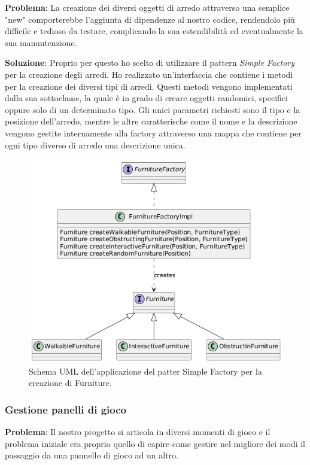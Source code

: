 \documentclass[a4paper,12pt]{report}
\begin{document}
\textbf{Problema}: La creazione dei diversi oggetti di arredo attraverso una semplice "new" comporterebbe
l'aggiunta di dipendenze al nostro codice, rendendolo più difficile e tedioso da testare, 
complicando la sua estendibilità ed eventualmente la sua manuntenzione. 

\textbf{Soluzione}: Proprio per questo ho scelto di utilizzare il pattern \textit{Simple Factory} per la 
creazione degli arredi. Ho realizzato un'interfaccia che contiene i metodi per la creazione dei diversi
tipi di arredi. Questi metodi vengono implementati dalla sua sottoclasse, la quale è in grado di creare 
oggetti randomici, specifici oppure solo di un determinato tipo. Gli unici parametri richiesti sono il tipo
e la posizione dell'arredo, mentre le altre caratterische come il nome e la descrizione vengono gestite
internamente alla factory attraverso una mappa che contiene per ogni tipo diverso di arredo una descrizione unica.

\begin{figure}[H]
	\centering{}
	\includegraphics[width=\textwidth]{img/furnitureSimpleFactory.png}
	\caption{Schema UML dell'applicazione del patter Simple Factory per la creazione di Furniture.}
	\label{img:furnitureSimpleFactory}
\end{figure}

\subsubsection{Gestione panelli di gioco}

\textbf{Problema}: Il nostro progetto si articola in diversi momenti di gioco e il problema iniziale
era proprio quello di capire come gestire nel migliore dei modi il passaggio da una pannello di gioco ad 
un altro.
\end{document}
